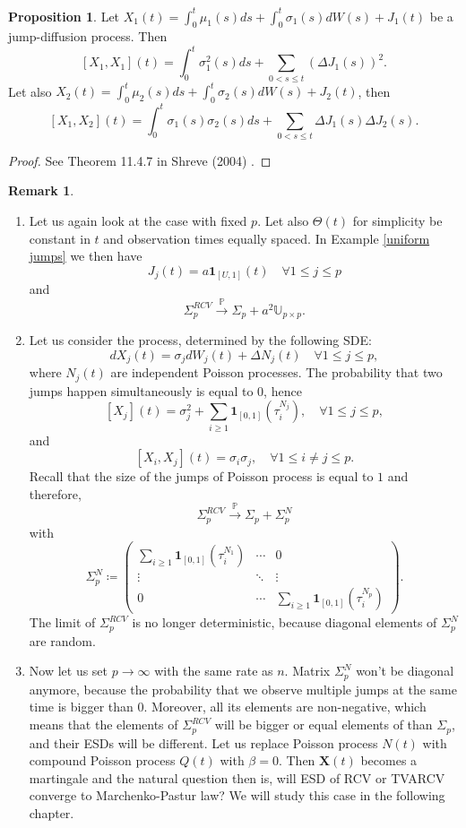 \documentclass[a4paper,11pt]{book}
\theoremstyle{plain}
\theoremstyle{definition}
\newtheorem{rmrk}[thm]{Remark}
\newtheorem{prps}[thm]{Proposition}
\newcommand{\MP}{\mathbb{P}}
\begin{document}
    \begin{prps}
    	Let $X_1(t) = \int_{0}^t \mu_1(s)ds + \int_{0}^{t} \sigma_1(s) dW(s) + J_1(t)$ be a jump-diffusion process. Then
    	\[ [X_1, X_1](t) = \int_0^t \sigma_1^2(s)ds + \sum_{0 < s \leq t} (\Delta J_1(s) )^2. \]
    	Let also $X_2(t) = \int_{0}^t \mu_2(s)ds + \int_{0}^{t} \sigma_2(s) dW(s) + J_2(t)$, then
    	\[ [X_1, X_2](t) = \int_0^t \sigma_1(s) \sigma_2(s) ds + \sum_{0 < s \leq t} \Delta J_1(s)\Delta J_2(s). \]
    \end{prps}
    \begin{proof}
    	See Theorem 11.4.7 in Shreve (2004) \cite{Shreve}.
    \end{proof}
    
    \begin{rmrk} \
    	\begin{enumerate}
    		\item Let us again look at the case with fixed $p$. Let also $\Theta(t)$ for simplicity be constant in $t$ and observation times equally spaced. In Example \ref{uniform jumps} we then have
    		\[J_j(t) = a\mathbf{1}_{[U, 1]}(t) \quad \forall 1 \leq j \leq p \]
    		and
    		\[ \Sigma_p^{RCV} \xrightarrow{\MP} \Sigma_p + a^2\mathbb{U}_{p \times p}.  \]
    		\item Let us consider the process, determined by the following SDE:
    		\[ dX_j(t) = \sigma_j dW_j(t) + \Delta N_j(t) \quad \forall 1 \leq j \leq p, \]
    		where $N_j(t)$ are independent Poisson processes. The probability that two jumps happen simultaneously is equal to $0$, hence
    		\[ [X_j](t) = \sigma_j^2 + \sum_{i \geq 1} \mathbf{1}_{[0, 1]} (\tau_i^{N_j}), \quad \forall 1 \leq j \leq p, \]
    		and
    		\[ [X_i, X_j](t) = \sigma_i \sigma_j, \quad \forall 1 \leq i \neq j \leq p. \]
    		Recall that the size of the jumps of Poisson process is equal to $1$ and therefore,
    		\[ \Sigma_p^{RCV} \xrightarrow{\MP} \Sigma_p + \Sigma_p^N\]
    		with
    		\[
    		\Sigma_p^N \coloneqq \begin{pmatrix}
    		\sum_{i \geq 1} \mathbf{1}_{[0, 1]} (\tau_i^{N_1}) & \cdots & 0 \\
    		\vdots & \ddots & \vdots \\
    		0 & \cdots & \sum_{i \geq 1} \mathbf{1}_{[0, 1]} (\tau_i^{N_p})
    		\end{pmatrix}
    		. \]
    		The limit of $\Sigma_p^{RCV}$ is no longer deterministic, because diagonal elements of $\Sigma_p^N$ are random. 
    		\item Now let us set $p \rightarrow \infty$ with the same rate as $n$. Matrix $\Sigma_p^N$ won't be diagonal anymore, because the probability that we observe multiple jumps at the same time is bigger than $0$. Moreover, all its elements are non-negative, which means that the elements of $\Sigma_p^{RCV}$ will be bigger or equal elements of than $\Sigma_p$, and their ESDs will be different. Let us replace Poisson process $N(t)$ with compound Poisson process $Q(t)$ with $\beta = 0$. Then $\mathbf{X}(t)$ becomes a martingale and the natural question then is, will ESD of RCV or TVARCV converge to Marchenko-Pastur law? We will study this case in the following chapter.
    	\end{enumerate}
    \end{rmrk}
\end{document}
